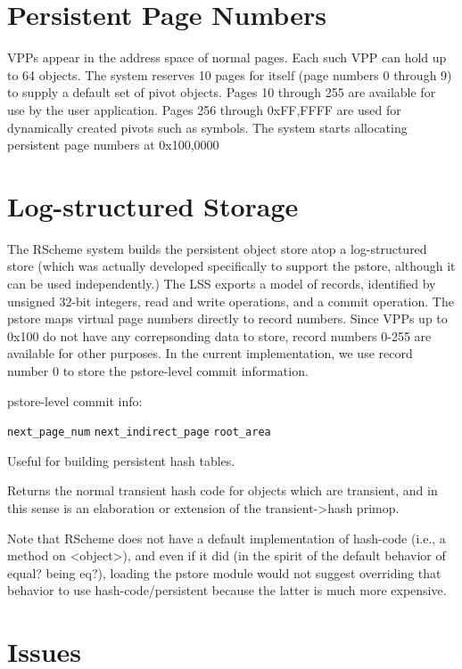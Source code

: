 \documentclass[10pt,letterpaper]{article}
\begin{document}
\section{Persistent Page Numbers}

VPPs appear in the address space of normal pages.  Each such VPP can
hold up to 64 objects.  The system reserves 10 pages for itself (page
numbers 0 through 9) to supply a default set of pivot objects.  Pages
10 through 255 are available for use by the user application.  Pages
256 through 0xFF,FFFF are used for dynamically created pivots such as
symbols.  The system starts allocating persistent page numbers at
0x100,0000




\section{Log-structured Storage}

The RScheme system builds the persistent object store atop a
log-structured store (which was actually developed specifically to
support the pstore, although it can be used independently.)
The LSS exports a model of records, identified by unsigned 32-bit
integers, read and write operations, and a commit operation.
The pstore maps virtual page numbers directly to record numbers.
Since VPPs up to 0x100 do not have any correpsonding data to
store, record numbers 0-255 are available for other purposes.  In the
current implementation, we use record number 0 to store the
pstore-level commit information.

pstore-level commit info:

  \texttt{next\_page\_num}
  \texttt{next\_indirect\_page}
  \texttt{root\_area}



Useful for building persistent hash tables.

Returns the normal transient hash code for objects which are
transient, and in this sense is an elaboration or extension of the
transient->hash primop.

Note that RScheme does not have a default implementation of
hash-code (i.e., a method on <object>), and even if it did
(in the spirit of the default behavior of equal? being eq?),
loading the pstore module would not suggest overriding that
behavior to use hash-code/persistent because the latter
is much more expensive.

\section{Issues}
\end{document}
